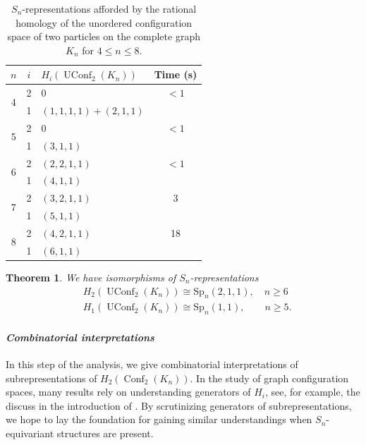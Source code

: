 \documentclass[12pt]{amsart}
\newtheorem{thm}{Theorem}[section]
\theoremstyle{definition}
\newcommand{\conf}{\operatorname{Conf}}
\newcommand{\uconf}{\operatorname{UConf}}
\begin{document}

\begin{table}[th]
\caption{$S_n$-representations afforded by the rational homology of the unordered configuration space of two particles on the complete graph $K_n$ for $4\leq n \leq 8$.}
\label{table: unordered 2 pts on Kn}
\begin{tabular}{@{}cclc@{}} \toprule
$n$ & $i$ & $H_i(\uconf_2(K_n))$ & Time (s) \\
\midrule
\multirow[t]{2}{*}{4} & 2 & 0 & $<1$ \\[2pt]
& 1 & $(1,1,1,1) + (2,1,1)$ & \\ \midrule
\multirow[t]{2}{*}{5} & 2   & 0 & $<1$ \\[2pt]
& 1   & $(3,1,1)$ & \\\midrule
\multirow[t]{2}{*}{6} & 2 & $(2, 2, 1, 1)$ & $<1$ \\[2pt]
& 1 & $(4,1,1)$ & \\\midrule
\multirow[t]{2}{*}{7} & 2 & $(3, 2, 1, 1)$ & 3 \\[2pt]
& 1 & $(5,1,1)$ & \\\midrule
\multirow[t]{2}{*}{8} & 2 & $(4, 2, 1, 1)$ & 18 \\[2pt]
& 1 & $(6,1,1)$ & \\
\bottomrule
\end{tabular}

\end{table}

\begin{thm}
    We have isomorphisms of $S_n$-representations 
    \begin{align*}
        &H_2(\uconf_2(K_n))\cong \mathrm{Sp}_n(2,1,1),\quad n\geq 6\\
        &H_1(\uconf_2(K_n))\cong \mathrm{Sp}_n(1,1),\qquad n\geq 5.
    \end{align*}
\end{thm}

\paragraph{\textit{Combinatorial interpretations}}
In this step of the analysis, we give combinatorial interpretations of subrepresentations of $H_2(\conf_2(K_n))$. In the study of graph configuration spaces, many results rely on understanding generators of $H_i$, see, for example, the discuss in the introduction of \cite{ADCK2}. By scrutinizing generators of subrepresentations, we hope to lay the foundation for gaining similar understandings when $S_n$-equivariant structures are present.
\end{document}
